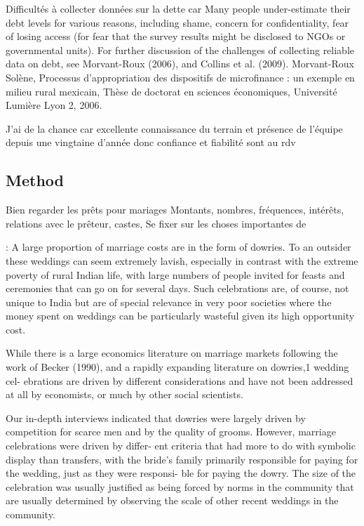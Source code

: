 \documentclass[a4paper, 11pt, onecolumn]{article}
\begin{document}
\cite{Guerin2014a} Difficultés à collecter données sur la dette car Many people under-estimate their debt levels for various reasons, including shame, concern for confidentiality,
fear of losing access (for fear that the survey results might be disclosed to NGOs or governmental units). For
further discussion of the challenges of collecting reliable data on debt, see Morvant-Roux (2006), and Collins et
al. (2009).
Morvant-Roux Solène, Processus d’appropriation des dispositifs de microfinance : un exemple en milieu
rural mexicain, Thèse de doctorat en sciences économiques, Université Lumière Lyon 2, 2006.

J'ai de la chance car excellente connaissance du terrain et présence de l'équipe depuis une vingtaine d'année donc confiance et fiabilité sont au rdv


\subsection{Method}
Bien regarder les prêts pour mariages
Montants, nombres, fréquences, intérêts, relations avec le prêteur, castes, 
Se fixer sur les choses importantes de \cite{Guerin2014a}




\cite{Bloch2004} : 
A large proportion of marriage costs are in the form of dowries.
To an outsider these weddings can seem extremely lavish, especially in contrast
with the extreme poverty of rural Indian life, with large numbers of people invited for
feasts and ceremonies that can go on for several days. Such celebrations are, of
course, not unique to India but are of special relevance in very poor societies where
the money spent on weddings can be particularly wasteful given its high opportunity
cost. 


While there is a large economics literature on marriage markets following the
work of Becker (1990), and a rapidly expanding literature on dowries,1 wedding cel-
ebrations are driven by different considerations and have not been addressed at all by
economists, or much by other social scientists.

 Our in-depth
interviews indicated that dowries were largely driven by competition for scarce men
and by the quality of grooms. However, marriage celebrations were driven by differ-
ent criteria that had more to do with symbolic display than transfers, with the bride's
family primarily responsible for paying for the wedding, just as they were responsi-
ble for paying the dowry. The size of the celebration was usually justified as being
forced by norms in the community that are usually determined by observing the scale
of other recent weddings in the community.
\end{document}
